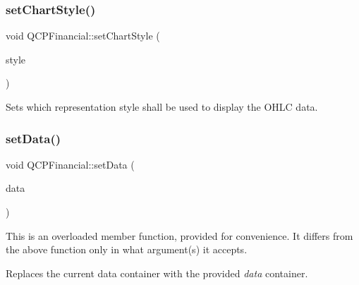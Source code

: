 \subsubsection{\texorpdfstring{set\+Chart\+Style()}{setChartStyle()}}
{\footnotesize\ttfamily void Q\+C\+P\+Financial\+::set\+Chart\+Style (\begin{DoxyParamCaption}\item[{\hyperlink{class_q_c_p_financial_a0f800e21ee98d646dfc6f8f89d10ebfb}{Q\+C\+P\+Financial\+::\+Chart\+Style}}]{style }\end{DoxyParamCaption})}

Sets which representation style shall be used to display the O\+H\+LC data. \mbox{\label{class_q_c_p_financial_a72089e75b8a50d18097526c3c79fdb85}} 
\subsubsection{\texorpdfstring{set\+Data()}{setData()}\hspace{0.1cm}{\footnotesize\ttfamily [1/2]}}
{\footnotesize\ttfamily void Q\+C\+P\+Financial\+::set\+Data (\begin{DoxyParamCaption}\item[{Q\+Shared\+Pointer$<$ \hyperlink{class_q_c_p_data_container}{Q\+C\+P\+Financial\+Data\+Container} $>$}]{data }\end{DoxyParamCaption})}

This is an overloaded member function, provided for convenience. It differs from the above function only in what argument(s) it accepts.

Replaces the current data container with the provided {\itshape data} container.

